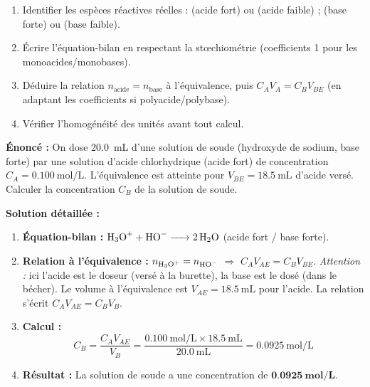 \documentclass[11pt]{article}
\begin{document}
\begin{methode}
\begin{enumerate}
  \item Identifier les espèces réactives réelles :  (acide fort) ou  (acide faible) ;  (base forte) ou  (base faible).
  \item Écrire l'équation-bilan en respectant la stœchiométrie (coefficients 1 pour les monoacides/monobases).
  \item Déduire la relation $n_{\text{acide}} = n_{\text{base}}$ à l'équivalence, puis $C_A V_A = C_B V_{BE}$ (en adaptant les coefficients si polyacide/polybase).
  \item Vérifier l'homogénéité des unités avant tout calcul.
\end{enumerate}
\end{methode}

\begin{exoresolu}
\textbf{Énoncé :} On dose \SI{20,0}{\mL} d'une solution de soude (hydroxyde de sodium, base forte) par une solution d'acide chlorhydrique (acide fort) de concentration $C_A = \SI{0,100}{\mol\per\L}$. L'équivalence est atteinte pour $V_{BE} = \SI{18,5}{\mL}$ d'acide versé. Calculer la concentration $C_B$ de la solution de soude.

\textbf{Solution détaillée :}
\begin{enumerate}
  \item \textbf{Équation-bilan :} $\ce{H3O+ + HO- -> 2 H2O}$ (acide fort / base forte).
  \item \textbf{Relation à l'équivalence :} $n_{\ce{H3O+}} = n_{\ce{HO-}}$ $\Rightarrow$ $C_A V_{AE} = C_B V_{BE}$.
    \emph{Attention :} ici l'acide est le doseur (versé à la burette), la base est le dosé (dans le bécher). Le volume à l'équivalence est $V_{AE} = \SI{18,5}{\mL}$ pour l'acide. La relation s'écrit $C_A V_{AE} = C_B V_B$.
  \item \textbf{Calcul :}
  \[
  C_B = \frac{C_A V_{AE}}{V_B} = \frac{\SI{0,100}{\mol\per\L} \times \SI{18,5}{\mL}}{\SI{20,0}{\mL}} = \SI{0,0925}{\mol\per\L}
  \]
  \item \textbf{Résultat :} La solution de soude a une concentration de $\boldsymbol{\SI{0,0925}{\mol\per\L}}$.
\end{enumerate}
\end{exoresolu}
\end{document}
